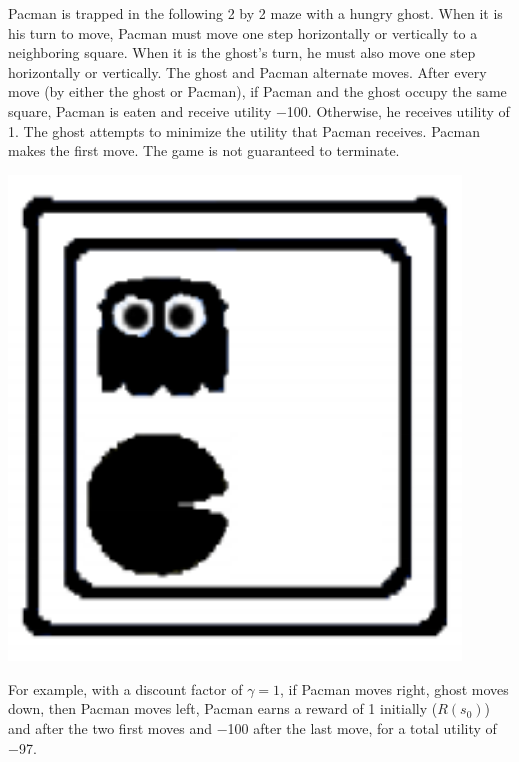 \documentclass[11pt, a4paper]{article}
\begin{document}
\begin{minipage}{0.725\textwidth}
    Pacman is trapped in the following 2 by 2 maze with a hungry ghost. When it is his turn to move, Pacman must move one step horizontally or vertically to a neighboring square. When it is the ghost's turn, he must also move one step horizontally or vertically. The ghost and Pacman alternate moves. After every move (by either the ghost or Pacman), if Pacman and the ghost occupy the same square, Pacman is eaten and receive utility \num{-100}. Otherwise, he receives utility of \num{1}. The ghost attempts to minimize the utility that Pacman receives. Pacman makes the first move. The game is not guaranteed to terminate.
\end{minipage}
\begin{minipage}{0.275\textwidth}
    \centering
    \includegraphics[width=0.9\textwidth]{figures/e6_pacman.png}
\end{minipage}

For example, with a discount factor of $\gamma = 1$, if Pacman moves right, ghost moves down, then Pacman moves left, Pacman earns a reward of 1 initially ($R(s_0)$) and after the two first moves and \num{-100} after the last move, for a total utility of \num{-97}.
\end{document}
